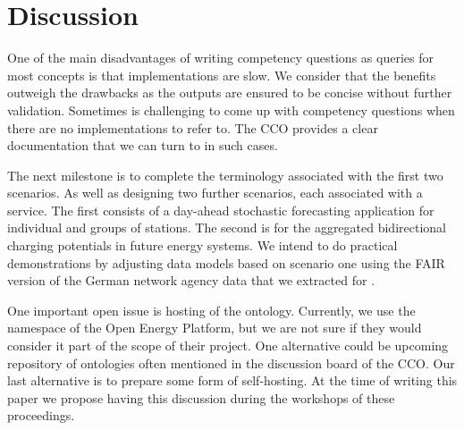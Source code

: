 \section{Discussion}
\label{discussion}

One of the main disadvantages of writing competency questions as queries for
most concepts is that implementations are slow. We consider that the benefits
outweigh the drawbacks as the outputs are ensured to be concise without further
validation. Sometimes is challenging to come up with competency questions when
there are no implementations to refer to. The CCO provides a clear documentation
that we can turn to in such cases.

The next milestone is to complete the terminology associated with the first two
scenarios. As well as designing two further scenarios, each associated with a
service. The first consists of a day-ahead stochastic forecasting application
for individual and groups of stations. The second is for the aggregated
bidirectional charging potentials in future energy systems.  
We intend to do practical demonstrations  by adjusting data models based on
scenario one using the FAIR version of the German network agency data that we
extracted for \cite{ArellanoRuiz.2024}.

One important open issue is hosting of the ontology. Currently, we use the
namespace of the Open Energy Platform, but we are not sure if they would
consider it part of the scope of their project. One alternative could be
upcoming repository of ontologies often mentioned in the discussion board of the
CCO. Our last alternative is to prepare some form of self-hosting. At the time
of writing this paper we propose having this discussion during the workshops of
these proceedings.
